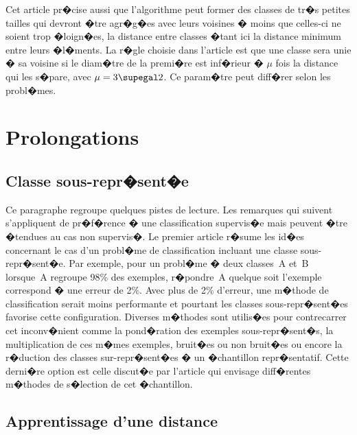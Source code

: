 Cet article pr�cise aussi que l'algorithme peut former des classes de tr�s petites tailles qui devront �tre agr�g�es avec leurs voisines � moins que celles-ci ne soient trop �loign�es, la distance entre classes �tant ici la distance minimum entre leurs �l�ments. La r�gle choisie dans l'article  est que une classe sera unie � sa voisine si le diam�tre de la premi�re est inf�rieur � $\mu$ fois la distance qui les s�pare, avec $\mu = 3 \supegal 2$. Ce param�tre peut diff�rer selon les probl�mes.

\section{Prolongations}

\subsection{Classe sous-repr�sent�e}


Ce paragraphe regroupe quelques pistes de lecture. Les remarques qui suivent s'appliquent de pr�f�rence � une classification supervis�e mais peuvent �tre �tendues au cas non supervis�. Le premier article  r�sume les id�es concernant le cas d'un probl�me de classification incluant une classe sous-repr�sent�e. Par exemple, pour un probl�me � deux classes~A et~B lorsque~A regroupe 98\% des exemples, r�pondre~A quelque soit l'exemple correspond � une erreur de 2\%. Avec plus de 2\% d'erreur, une m�thode de classification serait moins performante et pourtant les classes sous-repr�sent�es favorise cette configuration. Diverses m�thodes sont utilis�es pour contrecarrer cet inconv�nient comme la pond�ration des exemples sous-repr�sent�s, la multiplication de ces m�mes exemples, bruit�es ou non bruit�es ou encore la r�duction des classes sur-repr�sent�es � un �chantillon repr�sentatif. Cette derni�re option est celle discut�e par l'article  qui envisage diff�rentes m�thodes de s�lection de cet �chantillon.








\subsection{Apprentissage d'une distance}


